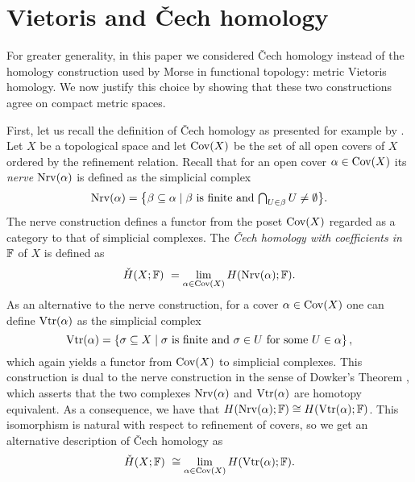 
\section{Vietoris and \texorpdfstring{\v{C}}{}ech homology} \label{s:vietoris}

For greater generality, in this paper we considered \v{C}ech homology instead of the homology construction used by Morse in functional topology: metric Vietoris homology.
We now justify this choice by showing that these two constructions agree on compact metric spaces.

First, let us recall the definition of \v{C}ech homology as presented for example by \citet[Section~IX--X]{Eilenberg.1952}.
Let $X$ be a topological space and let $\operatorname{Cov}(X)$ be the set of all open covers of $X$ ordered by the refinement relation. 
Recall that for an open cover $\alpha \in \operatorname{Cov}(X)$ its \emph{nerve} $\operatorname{Nrv}(\alpha)$ is defined as the simplicial complex
\begin{equation*}
\operatorname{Nrv}(\alpha) =
\big\{ \beta \subseteq \alpha \mid \beta \text{ is finite and } \textstyle{\bigcap_{U \in \beta}} \, U \neq \emptyset \big\}.
\end{equation*}
The nerve construction defines a functor from the poset $\operatorname{Cov}(X)$ regarded as a category to that of simplicial complexes. 
The \emph{\v{C}ech homology with coefficients in $\mathbb{F}$} of $X$ is defined as
\begin{equation*}
\check{H}(X; \mathbb{F}) \ =
\lim_{\alpha \in \operatorname{Cov}(X)} H(\operatorname{Nrv}(\alpha); \mathbb{F}).
\end{equation*}
As an alternative to the nerve construction, for a cover $\alpha \in \operatorname{Cov}(X)$ one can define $\operatorname{Vtr}(\alpha)$ as the simplicial complex
\begin{equation*}
\operatorname{Vtr} (\alpha) = \left\{ \sigma \subseteq X \mid \sigma \text{ is finite and } \sigma \in U \text{ for some } U \in \alpha \right\},
\end{equation*}
which again yields a functor from $\operatorname{Cov}(X)$ to simplicial complexes.
This construction is dual to the nerve construction in the sense of Dowker's Theorem \cite{Dowker.1952}, which asserts that the two complexes $\operatorname{Nrv} (\alpha)$ and $\operatorname{Vtr} (\alpha)$ are homotopy equivalent.
As a consequence, we have that $H (\operatorname{Nrv} (\alpha); \mathbb{F}) \cong H (\operatorname{Vtr} (\alpha); \mathbb{F})$.
This isomorphism is natural with respect to refinement of covers, so we get an alternative description of \v{C}ech homology as 
\begin{equation*}
\check{H} (X; \mathbb{F}) \ \cong
\lim_{\alpha \in \operatorname{Cov} (X)} H (\operatorname{Vtr} (\alpha); \mathbb{F}).
\end{equation*}

